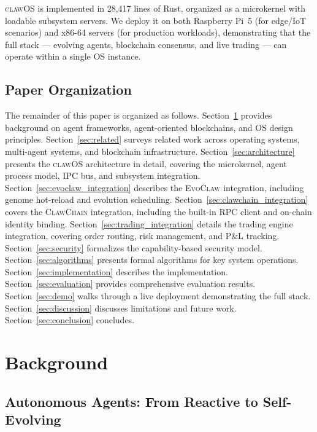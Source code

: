 \documentclass{article}
\newcommand{\clawos}{\textsc{clawOS}}
\newcommand{\evoclaw}{\textsc{EvoClaw}}
\newcommand{\clawchain}{\textsc{ClawChain}}
\begin{document}
\clawos{} is implemented in 28,417 lines of Rust, organized as a microkernel with loadable subsystem servers. We deploy it on both Raspberry Pi~5 (for edge/IoT scenarios) and x86-64 servers (for production workloads), demonstrating that the full stack — evolving agents, blockchain consensus, and live trading — can operate within a single OS instance.

\subsection{Paper Organization}

The remainder of this paper is organized as follows. Section~\ref{sec:background} provides background on agent frameworks, agent-oriented blockchains, and OS design principles. Section~\ref{sec:related} surveys related work across operating systems, multi-agent systems, and blockchain infrastructure. Section~\ref{sec:architecture} presents the \clawos{} architecture in detail, covering the microkernel, agent process model, IPC bus, and subsystem integration. Section~\ref{sec:evoclaw_integration} describes the \evoclaw{} integration, including genome hot-reload and evolution scheduling. Section~\ref{sec:clawchain_integration} covers the \clawchain{} integration, including the built-in RPC client and on-chain identity binding. Section~\ref{sec:trading_integration} details the trading engine integration, covering order routing, risk management, and P\&L tracking. Section~\ref{sec:security} formalizes the capability-based security model. Section~\ref{sec:algorithms} presents formal algorithms for key system operations. Section~\ref{sec:implementation} describes the implementation. Section~\ref{sec:evaluation} provides comprehensive evaluation results. Section~\ref{sec:demo} walks through a live deployment demonstrating the full stack. Section~\ref{sec:discussion} discusses limitations and future work. Section~\ref{sec:conclusion} concludes.

%
%

\section{Background}
\label{sec:background}

\subsection{Autonomous Agents: From Reactive to Self-Evolving}
\end{document}
